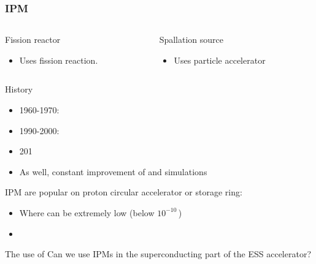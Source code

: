 \begin{frame}
  \frametitle{IPM}
  \begin{columns}[T]
    \begin{column}{0.45\textwidth}
      \begin{block}{Fission reactor}
        \begin{itemize}
          \item Uses fission reaction.
        \end{itemize}    
      \end{block}
      \vfill
    \end{column}
    \begin{column}{0.45\textwidth}
      \begin{block}{Spallation source}
        \begin{itemize}
          \item Uses particle accelerator
        \end{itemize}        
      \end{block}
      \vfill
    \end{column}
  \end{columns}
  \begin{block}{History}
    \begin{itemize}
      \item 1960-1970:
      \item 1990-2000:
      \item 201
      \item As well, constant improvement of and simulations
    \end{itemize}
  \end{block}
  IPM are popular on proton circular accelerator or storage ring:
  \begin{itemize}
    \item Where can be extremely low (below $10^{-10}\,\mathrm{}$)
    \item 
  \end{itemize}
  \begin{alertblock}{The use of }
    Can we use IPMs in the superconducting part of the ESS accelerator?
  \end{alertblock}
\end{frame}